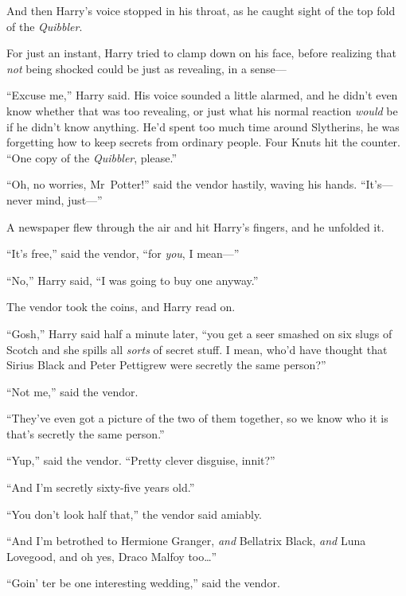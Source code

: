 And then Harry’s voice stopped in his throat, as he caught sight of the top fold of the \emph{Quibbler}.


For just an instant, Harry tried to clamp down on his face, before realizing that \emph{not} being shocked could be just as revealing, in a sense—

“Excuse me,” Harry said. His voice sounded a little alarmed, and he didn’t even know whether that was too revealing, or just what his normal reaction \emph{would} be if he didn’t know anything. He’d spent too much time around Slytherins, he was forgetting how to keep secrets from ordinary people. Four Knuts hit the counter. “One copy of the \emph{Quibbler}, please.”

“Oh, no worries, Mr~Potter!” said the vendor hastily, waving his hands. “It’s—never mind, just—”

A newspaper flew through the air and hit Harry’s fingers, and he unfolded it.


“It’s free,” said the vendor, “for \emph{you}, I mean—”

“No,” Harry said, “I was going to buy one anyway.”

The vendor took the coins, and Harry read on.

“Gosh,” Harry said half a minute later, “you get a seer smashed on six slugs of Scotch and she spills all \emph{sorts} of secret stuff. I mean, who’d have thought that Sirius Black and Peter Pettigrew were secretly the same person?”

“Not me,” said the vendor.

“They’ve even got a picture of the two of them together, so we know who it is that’s secretly the same person.”

“Yup,” said the vendor. “Pretty clever disguise, innit?”

“And I’m secretly sixty-five years old.”

“You don’t look half that,” the vendor said amiably.

“And I’m betrothed to Hermione Granger, \emph{and} Bellatrix Black, \emph{and} Luna Lovegood, and oh yes, Draco Malfoy too…”

“Goin’ ter be one interesting wedding,” said the vendor.

